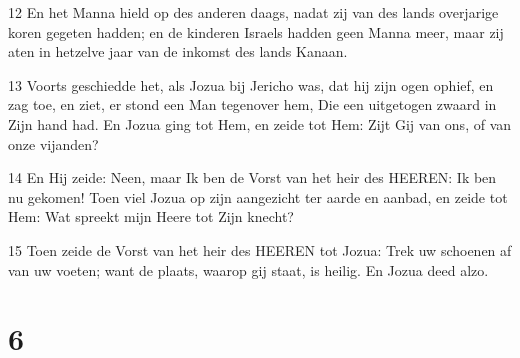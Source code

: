 \par 12 En het Manna hield op des anderen daags, nadat zij van des lands overjarige koren gegeten hadden; en de kinderen Israels hadden geen Manna meer, maar zij aten in hetzelve jaar van de inkomst des lands Kanaan.
\par 13 Voorts geschiedde het, als Jozua bij Jericho was, dat hij zijn ogen ophief, en zag toe, en ziet, er stond een Man tegenover hem, Die een uitgetogen zwaard in Zijn hand had. En Jozua ging tot Hem, en zeide tot Hem: Zijt Gij van ons, of van onze vijanden?
\par 14 En Hij zeide: Neen, maar Ik ben de Vorst van het heir des HEEREN: Ik ben nu gekomen! Toen viel Jozua op zijn aangezicht ter aarde en aanbad, en zeide tot Hem: Wat spreekt mijn Heere tot Zijn knecht?
\par 15 Toen zeide de Vorst van het heir des HEEREN tot Jozua: Trek uw schoenen af van uw voeten; want de plaats, waarop gij staat, is heilig. En Jozua deed alzo.

\chapter{6}

